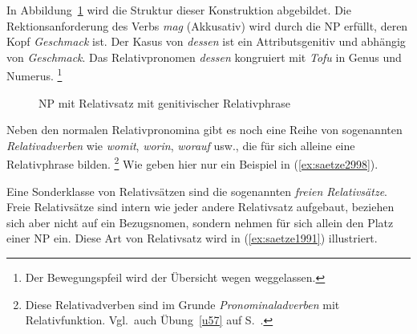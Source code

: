 
In Abbildung~\ref{fig:saetze5553} wird die Struktur dieser Konstruktion abgebildet.
Die Rektionsanforderung des Verbs \textit{mag} (Akkusativ) wird durch die NP erfüllt, deren Kopf \textit{Geschmack} ist.
Der Kasus von \textit{dessen} ist ein Attributsgenitiv und abhängig von \textit{Geschmack}.
Das Relativpronomen \textit{dessen} kongruiert mit \textit{Tofu} in Genus und Numerus.%
\footnote{Der Bewegungspfeil wird der Übersicht wegen weggelassen.}

\begin{figure}[!htbp]
  \centering
  \caption{NP mit Relativsatz mit genitivischer Relativphrase}
  \label{fig:saetze5553}
\end{figure}


Neben den normalen Relativpronomina gibt es noch eine Reihe von sogenannten \textit{Relativadverben} wie \textit{womit}, \textit{worin}, \textit{worauf} usw., die für sich alleine eine Relativphrase bilden.%
\footnote{Diese Relativadverben sind im Grunde \textit{Pronominaladverben} mit Relativfunktion.
Vgl.\ auch Übung~\ref{u57} auf S.~\pageref{u57}.}
Wie geben hier nur ein Beispiel in (\ref{ex:saetze2998}).

\begin{exe}
\end{exe}

Eine Sonderklasse von Relativsätzen sind die sogenannten \textit{freien Relativsätze}.
Freie Relativsätze sind intern wie jeder andere Relativsatz aufgebaut, beziehen sich aber nicht auf ein Bezugsnomen, sondern nehmen für sich allein den Platz einer NP ein.
Diese Art von Relativsatz wird in (\ref{ex:saetze1991}) illustriert.

